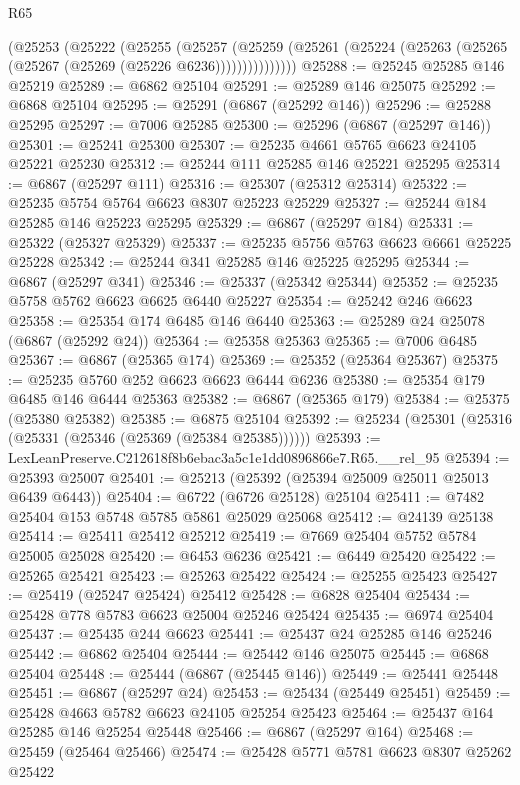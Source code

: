 \begin{lexlean}{R65}
\begin{coremodule}
{          (@25253
            (@25222
              (@25255
                (@25257
                  (@25259
                    (@25261 (@25224 (@25263 (@25265 (@25267 (@25269 (@25226 @6236)))))))))))))))
@25288 := @25245 @25285 @146 @25219
@25289 := @6862 @25104
@25291 := @25289 @146 @25075
@25292 := @6868 @25104
@25295 := @25291 (@6867 (@25292 @146))
@25296 := @25288 @25295
@25297 := @7006 @25285
@25300 := @25296 (@6867 (@25297 @146))
@25301 := @25241 @25300
@25307 := @25235 @4661 @5765 @6623 @24105 @25221 @25230
@25312 := @25244 @111 @25285 @146 @25221 @25295
@25314 := @6867 (@25297 @111)
@25316 := @25307 (@25312 @25314)
@25322 := @25235 @5754 @5764 @6623 @8307 @25223 @25229
@25327 := @25244 @184 @25285 @146 @25223 @25295
@25329 := @6867 (@25297 @184)
@25331 := @25322 (@25327 @25329)
@25337 := @25235 @5756 @5763 @6623 @6661 @25225 @25228
@25342 := @25244 @341 @25285 @146 @25225 @25295
@25344 := @6867 (@25297 @341)
@25346 := @25337 (@25342 @25344)
@25352 := @25235 @5758 @5762 @6623 @6625 @6440 @25227
@25354 := @25242 @246 @6623
@25358 := @25354 @174 @6485 @146 @6440
@25363 := @25289 @24 @25078 (@6867 (@25292 @24))
@25364 := @25358 @25363
@25365 := @7006 @6485
@25367 := @6867 (@25365 @174)
@25369 := @25352 (@25364 @25367)
@25375 := @25235 @5760 @252 @6623 @6623 @6444 @6236
@25380 := @25354 @179 @6485 @146 @6444 @25363
@25382 := @6867 (@25365 @179)
@25384 := @25375 (@25380 @25382)
@25385 := @6875 @25104
@25392 := @25234 (@25301 (@25316 (@25331 (@25346 (@25369 (@25384 @25385))))))
@25393 := LexLeanPreserve.C212618f8b6ebac3a5c1e1dd0896866e7.R65.__rel_95
@25394 := @25393 @25007
@25401 := @25213 (@25392 (@25394 @25009 @25011 @25013 @6439 @6443))
@25404 := @6722 (@6726 @25128) @25104
@25411 := @7482 @25404 @153 @5748 @5785 @5861 @25029 @25068
@25412 := @24139 @25138
@25414 := @25411 @25412 @25212
@25419 := @7669 @25404 @5752 @5784 @25005 @25028
@25420 := @6453 @6236
@25421 := @6449 @25420
@25422 := @25265 @25421
@25423 := @25263 @25422
@25424 := @25255 @25423
@25427 := @25419 (@25247 @25424) @25412
@25428 := @6828 @25404
@25434 := @25428 @778 @5783 @6623 @25004 @25246 @25424
@25435 := @6974 @25404
@25437 := @25435 @244 @6623
@25441 := @25437 @24 @25285 @146 @25246
@25442 := @6862 @25404
@25444 := @25442 @146 @25075
@25445 := @6868 @25404
@25448 := @25444 (@6867 (@25445 @146))
@25449 := @25441 @25448
@25451 := @6867 (@25297 @24)
@25453 := @25434 (@25449 @25451)
@25459 := @25428 @4663 @5782 @6623 @24105 @25254 @25423
@25464 := @25437 @164 @25285 @146 @25254 @25448
@25466 := @6867 (@25297 @164)
@25468 := @25459 (@25464 @25466)
@25474 := @25428 @5771 @5781 @6623 @8307 @25262 @25422
}
\end{coremodule}
\end{lexlean}
